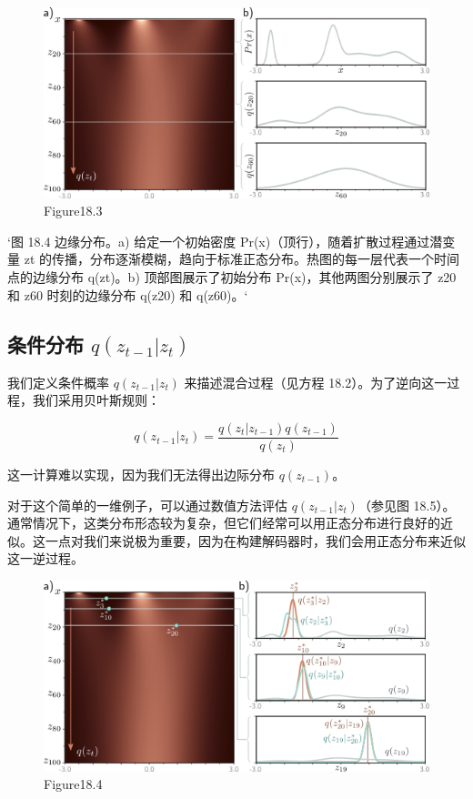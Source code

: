 \begin{figure}[h!]
\centering
\includegraphics[width=0.7\linewidth]{png/chapter18/DiffusionDensity.png}
\caption{Figure18.3}
\end{figure}

`图 18.4 边缘分布。a) 给定一个初始密度 Pr(x)（顶行），随着扩散过程通过潜变量 zt 的传播，分布逐渐模糊，趋向于标准正态分布。热图的每一层代表一个时间点的边缘分布 q(zt)。b) 顶部图展示了初始分布 Pr(x)，其他两图分别展示了 z20 和 z60 时刻的边缘分布 q(z20) 和 q(z60)。`

\subsection{条件分布 \(q(z_{t-1}|z_t)\)}
我们定义条件概率 \(q(z_{t-1}|z_t)\) 来描述混合过程（见方程 18.2）。为了逆向这一过程，我们采用贝叶斯规则：

\[
q(z_{t-1}|z_t) = \frac{q(z_t|z_{t-1})q(z_{t-1})}{q(z_t)} \tag{18.11}
\]

这一计算难以实现，因为我们无法得出边际分布 \(q(z_{t-1})\)。

对于这个简单的一维例子，可以通过数值方法评估 \(q(z_{t-1}|z_t)\)（参见图 18.5）。通常情况下，这类分布形态较为复杂，但它们经常可以用正态分布进行良好的近似。这一点对我们来说极为重要，因为在构建解码器时，我们会用正态分布来近似这一逆过程。

\begin{figure}[h!]
\centering
\includegraphics[width=0.7\linewidth]{png/chapter18/DiffusionReverse.png}
\caption{Figure18.4}
\end{figure}

